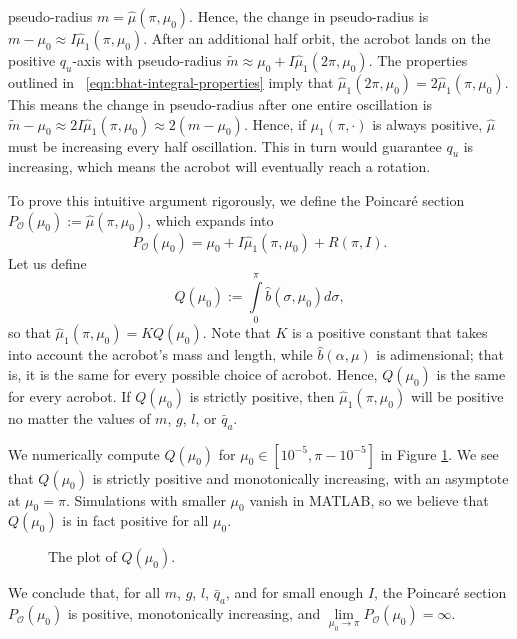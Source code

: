 pseudo-radius \(m = \hat{\mu}(\pi,\mu_0)\).
Hence, the change in pseudo-radius is 
\(m - \mu_0 \approx I\hat{\mu}_1(\pi,\mu_0)\).
After an additional half orbit, the acrobot lands on the positive \(q_u\)-axis
with pseudo-radius
\(\tilde{m} \approx \mu_0 + I\hat{\mu}_1(2\pi,\mu_0)\).
The properties outlined in ~\eqref{eqn:bhat-integral-properties} imply that
\(\hat{\mu}_1(2\pi,\mu_0) = 2 \hat{\mu}_1(\pi,\mu_0)\). 
This means the change in pseudo-radius after one entire oscillation is 
\(\tilde{m} - \mu_0 \approx 2I\hat{\mu}_1(\pi,\mu_0) \approx 2 (m - \mu_0)\).
Hence, if \(\hat{\mu}_1(\pi,\cdot)\) is always positive,
\(\hat{\mu}\) must be increasing every half oscillation.
This in turn would guarantee \(q_u\) is increasing, which means the acrobot
will eventually reach a rotation.

To prove this intuitive argument rigorously, we define the Poincar\'{e} section
\(P_\mathcal{O}(\mu_0) := \hat{\mu}(\pi,\mu_0)\), which expands into
\[
    P_\mathcal{O}(\mu_0) = \mu_0 + I \hat{\mu}_1(\pi,\mu_0) + R(\pi,I)
    .
\]
Let us define
\[
    Q(\mu_0) := \int \limits_0^\pi \hat{b}(\sigma,\mu_0)d\sigma
    ,
\]
so that \(\hat{\mu}_1(\pi,\mu_0) = K Q(\mu_0)\).
Note that \(K\) is a positive constant that takes into account the acrobot's
mass and length, while \(\hat{b}(\alpha,\mu)\) is adimensional;
that is, it is the same for every possible choice of acrobot.
Hence, \(Q(\mu_0)\) is the same for every acrobot.
If \(Q(\mu_0)\) is strictly positive, then \(\hat{\mu}_1(\pi,\mu_0)\) will be
positive no matter the values of \(m\), \(g\), \(l\), or \(\bar{q}_a\).

We numerically compute \(Q(\mu_0)\) for \(\mu_0 \in [10^{-5}, \pi - 10^{-5}]\)
in Figure \ref{fig:acrobot-Q}. 
We see that \(Q(\mu_0)\) is strictly positive and monotonically increasing, with
an asymptote at \(\mu_0 = \pi\). 
Simulations with smaller \(\mu_0\) vanish in MATLAB, so we believe that 
\(Q(\mu_0)\) is in fact positive for all \(\mu_0\).

\begin{figure}
    \centering
    \caption{The plot of \(Q(\mu_0)\).}
    \label{fig:acrobot-Q}
\end{figure}

We conclude that, for all \(m\), \(g\), \(l\), \(\bar{q}_a\), and for small
enough \(I\), the Poincar\'{e} section \(P_\mathcal{O}(\mu_0)\) is positive,
monotonically increasing, and 
\(\lim \limits_{\mu_0 \to \pi} P_\mathcal{O}(\mu_0) = \infty\).


